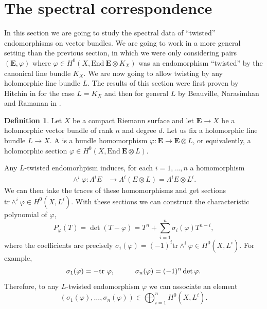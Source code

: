 \documentclass[12pt,a4paper]{book}
\theoremstyle{definition} \newtheorem{defn}[thm]{Definition}
\theoremstyle{definition} \newtheorem{ejemplo}[thm]{Example}
\theoremstyle{remark} \newtheorem{rem}[thm]{Remark}
\def\tr{\mathrm{tr}}
\def\End{\mathrm{End}}
\newcommand{\ve}[1]{\mathbf{#1}}
\let\emph\relax
\begin{document}
    \section{The spectral correspondence}
    In this section we are going to study the spectral data of ``twisted'' endomorphisms on vector bundles. We are going to work in a more general setting than the previous section, in which we were only considering pairs $(\ve{E},\varphi)$ where $\varphi\in H^0(X,\End\ \ve{E} \otimes K_X)$ was an endomorphism ``twisted'' by the canonical line bundle $K_X$. We are now going to allow twisting by any holomorphic line bundle $L$. The results of this section were first proven by Hitchin in \cite{hitchinsystem} for the case $L=K_X$ and then for general $L$ by Beauville, Narasimhan and Ramanan in \cite{bnr}.

    \begin{defn}
      Let $X$ be a compact Riemann surface and let $\ve{E}\rightarrow X$ be a holomorphic vector bundle of rank $n$ and degree $d$. Let us fix a holomorphic line bundle $L\rightarrow X$. A \emph{$L$-twisted endomorphism} is a bundle homomorphism $\varphi:\ve{E}\rightarrow \ve{E}\otimes L$, or equivalently, a holomorphic section $\varphi \in H^0(X,\End\ \ve{E} \otimes L)$.
    \end{defn}

    Any $L$-twisted endomorhpism induces, for each $i=1,\dots,n$ a homomorphism
    \begin{align*}
      \wedge^i\varphi : \Lambda^i E&\longrightarrow \Lambda^i(E\otimes L)= \Lambda^i E \otimes L^{i}.
      \end{align*}
      We can then take the traces of these homomorphisms and get sections $\tr \wedge^i \varphi \in H^0(X,L^{i})$. With these sections we can construct the characteristic polynomial of $\varphi$, 
      \begin{equation*}
	P_\varphi(T)=\det(T-\varphi)=T^n+\sum_{i=1}^n \sigma_i(\varphi) T^{n-i},
      \end{equation*}
      where the coefficients are precisely $\sigma_i(\varphi)=(-1)^i\tr \wedge^i \varphi \in H^0(X,L^{i})$. For example, $$\sigma_1(\varphi)=-\tr\ \varphi, \hspace{1 cm} \sigma_n(\varphi)=(-1)^n \det \varphi.$$
      Therefore, to any $L$-twisted endomorphism $\varphi$ we can associate an element 
      \begin{equation*}
	(\sigma_1(\varphi),\dots,\sigma_n(\varphi)) \in \bigoplus_{i=1}^n H^0(X,L^i).
      \end{equation*}
\end{document}
